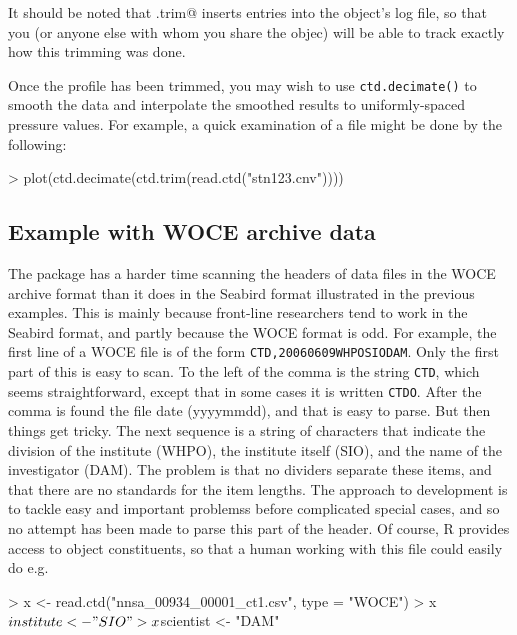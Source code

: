 \documentclass{article}
\begin{document}
It should be noted that \verb@ctd.trim@ inserts entries into the object's log file, so that you
(or anyone else with whom you share the objec) will be able to track exactly how this trimming
was done.

Once the profile has been trimmed, you may wish to use \texttt{ctd.decimate()} to smooth the
data and interpolate the smoothed results to uniformly-spaced pressure values. For example, a
quick examination of a file might be done by the following:
\begin{Schunk}
\begin{Sinput}
> plot(ctd.decimate(ctd.trim(read.ctd("stn123.cnv"))))
\end{Sinput}
\end{Schunk}

\subsection{Example with WOCE archive data}

The package has a harder time scanning the headers of data files in the WOCE archive format than
it does in the Seabird format illustrated in the previous examples. This is mainly because
front-line researchers tend to work in the Seabird format, and partly because the WOCE format is
odd. For example, the first line of a WOCE file is of the form \texttt{CTD,20060609WHPOSIODAM}.
Only the first part of this is easy to scan. To the left of the comma is the string \texttt{CTD},
which seems straightforward, except that in some cases it is written \texttt{CTDO}. After the
comma is found the file date (yyyymmdd), and that is easy to parse. But then things get tricky.
The next sequence is a string of characters that indicate the division of the institute (WHPO),
the institute itself (SIO), and the name of the investigator (DAM). The problem is that no
dividers separate these items, and that there are no standards for the item lengths. The approach
to \verb@oce@ development is to tackle easy and important problemss before complicated special
cases, and so no attempt has been made to parse this part of the header. Of course, R provides
access to object constituents, so that a human working with this file could easily do e.g.
\begin{Schunk}
\begin{Sinput}
> x <- read.ctd("nnsa_00934_00001_ct1.csv", type = "WOCE")
> x$institute <- "SIO"
> x$scientist <- "DAM"
\end{Sinput}
\end{Schunk}
\end{document}
